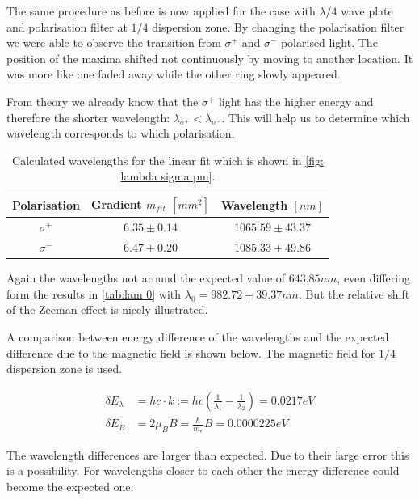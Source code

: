 \documentclass[]{article}
\begin{document}
The same procedure as before is now applied for the case with $\lambda/4$ wave plate and polarisation filter at $1/4$ dispersion zone. By changing the polarisation filter we were able to observe the transition from $\sigma^+$ and $\sigma^-$ polarised light. The position of the maxima shifted not continuously by moving to another location. It was more like one faded away while the other ring slowly appeared.

From theory we already know that the $\sigma^+$ light has the higher energy and therefore the shorter wavelength: $\lambda_{\sigma^+} < \lambda_{\sigma^-}$. This will help us to determine which wavelength corresponds to which polarisation.

\begin{table}[H]
\centering
\begin{tabular}{c|c|c}
Polarisation & Gradient $m_{fit}$ $[mm^2]$ & Wavelength $[nm]$ \\ \hline\hline
$\sigma^+$ & $6.35 \pm 0.14$  & $1065.59 \pm 43.37$  \\ \hline
$\sigma^-$ & $6.47 \pm 0.20$  & $1085.33 \pm 49.86$  
\end{tabular}
\caption{Calculated wavelengths for the linear fit which is shown in \autoref{fig: lambda sigma pm}.}
\label{tab: lam sigmas}
\end{table}

Again the wavelengths not around the expected value of $643.85nm$, even differing form the results in \autoref{tab:lam 0} with $\lambda_0 = 982.72\pm39.37 nm$. But the relative shift of the Zeeman effect is nicely illustrated.

A comparison between energy difference of the wavelengths and the expected difference due to the magnetic field is shown below. The magnetic field for $1/4$ dispersion zone is used.

\begin{align}
\delta E_\lambda &= hc\cdot k := hc\left(\frac{1}{\lambda_1}- \frac{1}{\lambda_2}\right) = 0.0217 eV \\
\delta E_B &= 2\mu_B B = \frac{\hbar}{m_e}B = 0.0000225 eV 
\label{eq: 10^3 faktor}
\end{align}

The wavelength differences are larger than expected. Due to their large error this is a possibility. For wavelengths closer to each other the energy difference could become the expected one.
\end{document}
